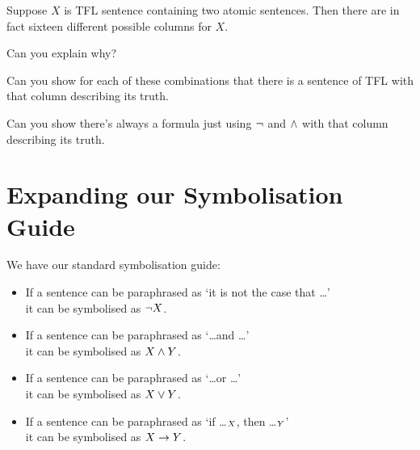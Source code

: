 \begin{practiceproblems}
\begin{problemslist}
	\end{problemslist}
	\problempart
	Suppose $X$ is TFL sentence containing two atomic sentences. Then there are in fact sixteen different possible columns for $X$.
	\begin{problemslist}
		\item Can you explain why?
		\item Can you show for each of these combinations that there is a sentence of TFL with that column describing its truth.
		\item {} Can you show there's always a formula just using $\neg$ and $\mathbin{\wedge}$ with that column describing its truth.
	\end{problemslist}
	
	
\end{practiceproblems}


\chapter{Expanding our Symbolisation Guide}\label{sec:symbcon}
We have our standard symbolisation guide: 
	\begin{itemize}
	\item If a sentence can be paraphrased as `it is not the case that \ldots'\\ it can be symbolised as $\neg X$.
	\item If a sentence can be paraphrased as `\ldots and \ldots'\\ it can be symbolised as $X\mathbin{\wedge} Y$.
	\item If a sentence can be paraphrased as `\ldots or \ldots'\\ it can be symbolised as $X\vee Y$.
	\item If a sentence can be paraphrased as `if \ldots$_X$, then \ldots$_Y$'\\ it can be symbolised as $X\rightarrow Y$.
\end{itemize}

